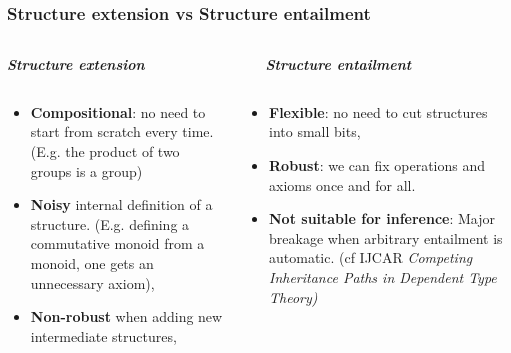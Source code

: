 \documentclass[11pt]{beamer}
\begin{document}
\begin{frame}
  \frametitle{Structure extension vs Structure entailment}
  \begin{columns}
    \begin{column}{0.5\textwidth}
      \begin{center}
        {\bf \emph{Structure extension}}
      \end{center}
    \end{column}
    \begin{column}{0.5\textwidth}
      \begin{center}
        {\bf \emph{Structure entailment}}
      \end{center}
    \end{column}
  \end{columns}
  \vfill
  \begin{columns}
    \begin{column}{0.5\textwidth}
      \begin{itemize}
      \item \textbf{Compositional}: no need to start from scratch every time.
        (E.g. the product of two groups is a group)
        \pause\vfill
      \item \textbf{Noisy} internal definition of a structure.
        (E.g. defining a commutative monoid from a monoid, one gets an unnecessary axiom),
        \pause\vfill
      \item \textbf{Non-robust} when adding new
        intermediate structures, \pause\vfill
      \end{itemize}
    \end{column}
    \begin{column}{0.5\textwidth}
      \begin{itemize}
      \item \textbf{Flexible}: no need to cut structures
        into small bits,
        \pause\vfill
      \item \textbf{Robust}: we can fix operations and axioms
        once and for all.
        \pause\vfill
      \item \textbf{Not suitable for inference}: Major breakage when
        arbitrary entailment is automatic. (cf IJCAR \emph{Competing
          Inheritance Paths in Dependent Type Theory)} \pause\vfill
      \end{itemize}
    \end{column}
  \end{columns}
  \vfill

\end{frame}
\end{document}

